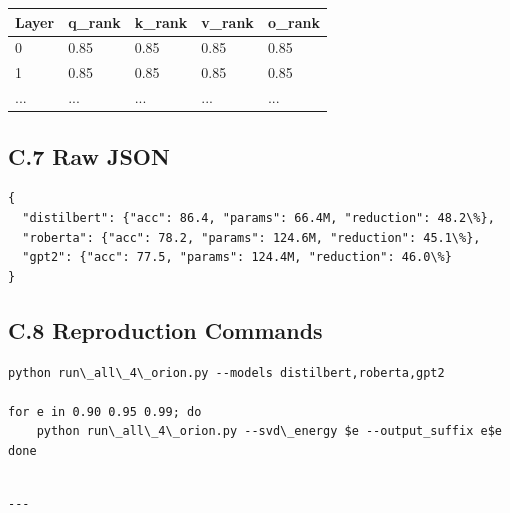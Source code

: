 \begin{table}[H]
\centering
\small
\begin{tabular}{lllll}
\toprule
\textbf{Layer} & \textbf{q\_rank} & \textbf{k\_rank} & \textbf{v\_rank} & \textbf{o\_rank} \\
\midrule
0 & 0.85 & 0.85 & 0.85 & 0.85 \\
1 & 0.85 & 0.85 & 0.85 & 0.85 \\
... & ... & ... & ... & ... \\
\bottomrule
\end{tabular}
\end{table}

\subsection{C.7 Raw JSON}

\begin{lstlisting}
{
  "distilbert": {"acc": 86.4, "params": 66.4M, "reduction": 48.2\%},
  "roberta": {"acc": 78.2, "params": 124.6M, "reduction": 45.1\%},
  "gpt2": {"acc": 77.5, "params": 124.4M, "reduction": 46.0\%}
}
\end{lstlisting}

\subsection{C.8 Reproduction Commands}

\begin{lstlisting}
python run\_all\_4\_orion.py --models distilbert,roberta,gpt2

for e in 0.90 0.95 0.99; do
    python run\_all\_4\_orion.py --svd\_energy $e --output_suffix e$e
done
\end{lstlisting}
\begin{lstlisting}

---
\end{lstlisting}